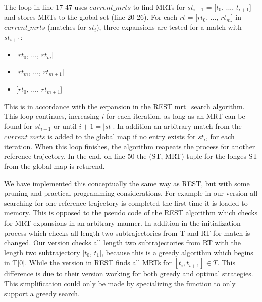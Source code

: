 The loop in line 17-47 uses $current\_mrts$ to find MRTs for $st_{i+1}$ = [$t_0$, ..., $t_{i+1}$] and stores MRTs to the global set (line 20-26). For each $rt$ = [$rt_0$, ..., $rt_m$] in $current\_mrts$ (matches for $st_i$), three expansions are tested for a match with $st_{i+1}$:
\begin{itemize}
    \item {[$rt_0$, ..., $rt_m$]}
    \item {[$rt_m$, ..., $rt_{m+1}$]}
    \item {[$rt_0$, ..., $rt_{m+1}$]}
\end{itemize}
This is in accordance with the expansion in the REST mrt\_search algorithm. This loop continues, increasing $i$ for each iteration, as long as an MRT can be found for $st_{i+1}$ or until $i+1 = |st|$. In addition an arbitrary match from the $current\_mrts$ is added to the global map if no entry exists for $st_{i}$, for each iteration. When this loop finishes, the algorithm reapeats the process for another reference trajectory. In the end, on line 50 the (ST, MRT) tuple for the longes ST from the global map is returend.

We have implemented this conceptually the same way as REST, but with some pruning and practical programming considerations. For example in our version all searching for one reference trajectory is completed the first time it is loaded to memory. This is opposed to the pseudo code of the REST algorithm which checks for MRT expansions in an arbitrary manner. In addition in the initialization process which checks all length two subtrajectories from T and RT for match is changed. Our version checks all length two subtrajectories from RT with the length two subtrajectory [$t_0$, $t_1$], because this is a greedy algorithm which begins in T[0]. While the version in REST finds all MRTs for $[t_i, t_{i+1}] \in T$. This difference is due to their version working for both greedy and optimal strategies. This simplification could only be made by specializing the function to only support a greedy search.

